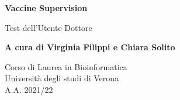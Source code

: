 \documentclass{article}
\begin{document}
\newcommand\tab[1][0.3cm]{\hspace*{#1}}


\begin{titlepage}
    \begin{center}
        \vspace*{1cm}
            
        \Huge
        \textbf{Vaccine Supervision}
            
        \vspace{0.5cm}
        \LARGE
        Test dell'Utente Dottore
            
        \vspace{1.5cm}
            
        \textbf{A cura di Virginia Filippi e Chiara Solito}

        \vspace{0.8cm}

            
        \Large
        Corso di Laurea in Bioinformatica\\
        Università degli studi di Verona\\
        A.A. 2021/22
            
    \end{center}
\end{titlepage}
\end{document}
